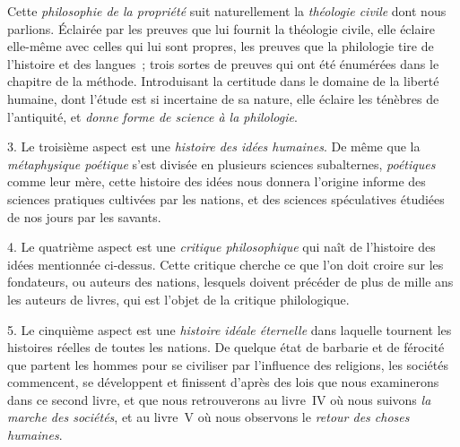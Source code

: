 \documentclass[french,twoside]{book} %
\begin{document}
Cette {\itshape philosophie de la propriété} suit naturellement la {\itshape théologie civile} dont nous parlions. Éclairée par les preuves que lui fournit la théologie civile, elle éclaire elle-même avec celles qui lui sont propres, les preuves que la philologie tire de l’histoire  et des langues ; trois sortes de preuves qui ont été énumérées dans le chapitre de la méthode. Introduisant la certitude dans le domaine de la liberté humaine, dont l’étude est si incertaine de sa nature, elle éclaire les ténèbres de l’antiquité, et {\itshape donne forme de science à la philologie}.\par
3. Le troisième aspect est une {\itshape histoire des idées humaines}. De même que la {\itshape métaphysique poétique} s’est divisée en plusieurs sciences subalternes, {\itshape poétiques} comme leur mère, cette histoire des idées nous donnera l’origine informe des sciences pratiques cultivées par les nations, et des sciences spéculatives étudiées de nos jours par les savants.\par
4. Le quatrième aspect est une {\itshape critique philosophique} qui naît de l’histoire des idées mentionnée ci-dessus. Cette critique cherche ce que l’on doit croire sur les fondateurs, ou auteurs des nations, lesquels doivent précéder de plus de mille ans les auteurs de livres, qui est l’objet de la critique philologique.\par
5. Le cinquième aspect est une {\itshape histoire idéale éternelle} dans laquelle tournent les histoires réelles de toutes les nations. De quelque état de barbarie et de férocité que partent les hommes pour se civiliser par l’influence des religions, les sociétés commencent, se développent et finissent d’après des lois que nous examinerons dans ce second livre, et que nous retrouverons au livre IV où nous suivons {\itshape la marche des sociétés}, et au livre V où nous observons le {\itshape retour des choses humaines}.\par
\end{document}
